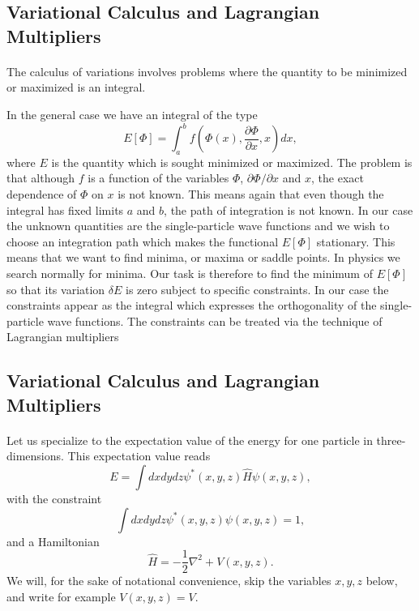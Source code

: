 \documentclass[%
twoside,                 %
final,                   %
10pt]{article}
\begin{document}
\subsection{Variational Calculus and Lagrangian Multipliers}

\paragraph{}
The calculus of variations involves 
problems where the quantity to be minimized or maximized is an integral. 

In the general case we have an integral of the type
\[ 
E[\Phi]= \int_a^b f(\Phi(x),\frac{\partial \Phi}{\partial x},x)dx,
\]
where $E$ is the quantity which is sought minimized or maximized.
The problem is that although $f$ is a function of the variables $\Phi$, $\partial \Phi/\partial x$ and $x$, the exact dependence of
$\Phi$ on $x$ is not known.  This means again that even though the integral has fixed limits $a$ and $b$, the path of integration is
not known. In our case the unknown quantities are the single-particle wave functions and we wish to choose an integration path which makes
the functional $E[\Phi]$ stationary. This means that we want to find minima, or maxima or saddle points. In physics we search normally for minima.
Our task is therefore to find the minimum of $E[\Phi]$ so that its variation $\delta E$ is zero  subject to specific
constraints. In our case the constraints appear as the integral which expresses the orthogonality of the  single-particle wave functions.
The constraints can be treated via the technique of Lagrangian multipliers




\subsection{Variational Calculus and Lagrangian Multipliers}

\paragraph{}
Let us specialize to the expectation value of the energy for one particle in three-dimensions.
This expectation value reads
\[
  E=\int dxdydz \psi^*(x,y,z) \hat{H} \psi(x,y,z),
\]
with the constraint
\[
 \int dxdydz \psi^*(x,y,z) \psi(x,y,z)=1,
\]
and a Hamiltonian
\[
\hat{H}=-\frac{1}{2}\nabla^2+V(x,y,z).
\]
We will, for the sake of notational convenience,  skip the variables $x,y,z$ below, and write for example $V(x,y,z)=V$.
\end{document}
